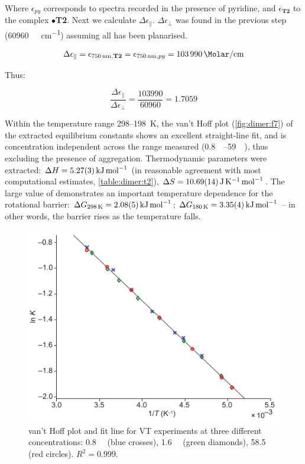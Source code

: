 		Where $\epsilon_{py}$ corresponds to spectra recorded in the presence of pyridine, and $\epsilon_{\textbf{T2}}$ to the complex $\bullet$\textbf{T2}. Next we calculate $\Delta \epsilon_\parallel$. $\Delta \epsilon_\bot$ was found in the previous step (\SI{60960}{\per\Molar\per\centi\metre}) assuming all  has been planarised.

		\begin{equation}
			\Delta \epsilon_\parallel = \epsilon_{\SI{750}{\nano\metre}, \textbf{T2}} = \epsilon_{\SI{750}{\nano\metre}, py} = \SI{103990}{\per\Molar\per\centi\metre} 
		\end{equation}

		Thus:

		\begin{equation}
		\frac{\Delta \epsilon_\parallel}{\Delta \epsilon_\bot} = \frac{\num{103990}}{\num{60960}} = 1.7059
		\end{equation}


		Within the temperature range 298–\SI{198}{\kelvin}, the van't Hoff plot (\autoref{fig:dimer:f7}) of the extracted equilibrium constants shows an excellent straight-line fit, and is concentration independent across the range measured (\SIrange{0.8}{59}{\micro\Molar}), thus excluding the presence of aggregation. Thermodynamic parameters were extracted: $\delh = \SI{5.27 \pm 0.03}{\kilo\joule\per\mole}$ (in reasonable agreement with most computational estimates, \autoref{table:dimer:t2}), $\dels = \SI{10.69 \pm 0.14}{\joule\per\kelvin\per\mole}$. The large value of \dels demonstrates an important temperature dependence for the rotational barrier: $\Delta G_{\SI{298}{\kelvin}} = \SI{2.08 \pm 0.05}{\kilo\joule\per\mole}$;  $\Delta G_{\SI{180}{\kelvin}} = \SI{3.35 \pm 0.04}{\kilo\joule\per\mole}$ -- in other words, the barrier rises as the temperature falls.

		\begin{figure}[ht!]
			\centering\includegraphics{figures/dimer/Figure-7.pdf} 
			\caption[]{van't Hoff plot and fit line for VT experiments at three different concentrations: \SI{0.8}{\micro\Molar} (blue crosses), \SI{1.6}{\micro\Molar} (green diamonds), \SI{58.5}{\micro\Molar} (red circles). $R^{2} = 0.999$.}
			\label{fig:dimer:f7}
		\end{figure}

